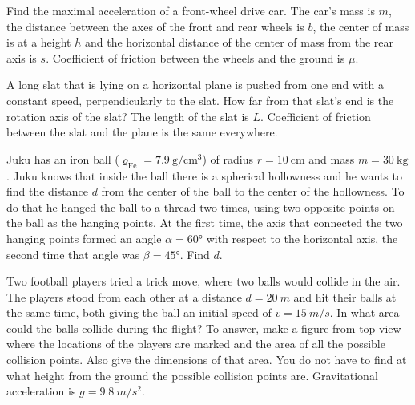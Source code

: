 \documentclass[11pt]{article}
\begin{document}

\probeng
Find the maximal acceleration of a front-wheel drive car. The car’s mass is $m$, the distance between the axes of the front and rear wheels is $b$, the center of mass is at a height $h$ and the horizontal distance of the center of mass from the rear axis is $s$. Coefficient of friction between the wheels and the ground is $\mu$.
\probend
\bigskip


\probeng
A long slat that is lying on a horizontal plane is pushed from one end with a constant speed, perpendicularly to the slat. How far from that slat’s end is the rotation axis of the slat? The length of the slat is $L$. Coefficient of friction between the slat and the plane is the same everywhere.
\probend
\bigskip


\probeng
Juku has an iron ball ($\varrho_\mathrm{Fe}=\SI{7,9}{\gram\per\centi\meter\cubed}$) of radius $r=\SI{10}{\centi\meter}$ and mass $m=\SI{30}{\kilo\gram}$. Juku knows that inside the ball there is a spherical hollowness and he wants to find the distance $d$ from the center of the ball to the center of the hollowness. To do that he hanged the ball to a thread two times, using two opposite points on the ball as the hanging points. At the first time, the axis that connected the two hanging points formed an angle $\alpha=\ang{60}$ with respect to the horizontal axis, the second time that angle was $\beta=\ang{45}$. Find $d$.
\probend
\bigskip


\probeng
Two football players tried a trick move, where two balls would collide in the air. The players stood from each other at a distance $d = \SI{20}{m}$ and hit their balls at the same time, both giving the ball an initial speed of $v = \SI{15}{m/s}$. In what area could the balls collide during the flight? To answer, make a figure from top view where the locations of the players are marked and the area of all the possible collision points. Also give the dimensions of that area. You do not have to find at what height from the ground the possible collision points are. Gravitational acceleration is $g = \SI{9,8}{m/s^2}$.
\probend
\bigskip
\end{document}
